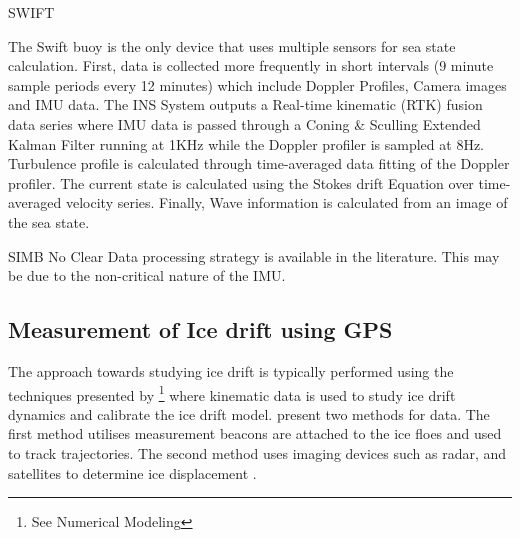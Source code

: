 \par{SWIFT}

The Swift buoy is the only device that uses multiple sensors for sea state calculation. First, data is collected more frequently in short intervals (9 minute sample periods every 12 minutes) which include Doppler Profiles, Camera images and IMU data. The INS System outputs a Real-time kinematic (RTK) fusion data series where IMU data is passed through a Coning \& Sculling Extended Kalman Filter running at 1KHz while the Doppler profiler is sampled at 8Hz. Turbulence profile is calculated through time-averaged data fitting of the Doppler profiler. The current state is calculated using the Stokes drift Equation over time-averaged velocity series. Finally, Wave information is calculated from an image of the sea state.

\par{SIMB}
No Clear Data processing strategy is available in the literature. This may be due to the non-critical nature of the IMU.

\subsection{Measurement of Ice drift using GPS}

The approach towards studying ice drift is typically performed using the techniques presented by \textcite{hibler1979dynamic} \footnote{See Numerical Modeling} where kinematic data is used to study ice drift dynamics and calibrate the ice drift model.\textcite{lepparanta2001sea} present two methods for data. The first method utilises measurement beacons are attached to the ice floes and used to track trajectories. The second method uses imaging devices such as radar, and satellites to determine ice displacement \cite{lepparanta2001sea}.\par

